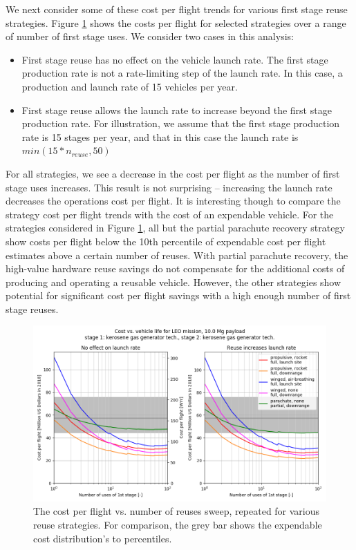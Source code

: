 \documentclass[conf]{new-aiaa}
\begin{document}
\begin{multicols}{2}
We next consider some of these cost per flight trends for various first stage reuse strategies. Figure \ref{fig:num_reuse_sweep_LEO_kerosene} shows the costs per flight for selected strategies over a range of number of first stage uses. We consider two cases in this analysis: 

\begin{itemize}
  \item First stage reuse has no effect on the vehicle launch rate. The first stage production rate is not a rate-limiting step of the launch rate. In this case, a production and launch rate of 15 vehicles per year. 
  \item First stage reuse allows the launch rate to increase beyond the first stage production rate. For illustration, we assume that the first stage production rate is 15 stages per year, and that in this case the launch rate is $min(15 * n_{reuse}, 50)$
\end{itemize}

For all strategies, we see a decrease in the cost per flight as the number of first stage uses increases. This result is not surprising -- increasing the launch rate decreases the operations cost per flight. It is interesting though to compare the strategy cost per flight trends with the cost of an expendable vehicle. For the strategies considered in Figure \ref{fig:num_reuse_sweep_LEO_kerosene}, all but the partial parachute recovery strategy show costs per flight below the 10th percentile of expendable cost per flight estimates above a certain number of reuses. With partial parachute recovery, the high-value hardware reuse savings do not compensate for the additional costs of producing and operating a reusable vehicle. However, the other strategies show potential for significant cost per flight savings with a high enough number of first stage reuses. 

\begin{figure}
    \centering
    \includegraphics[width=\textwidth]{../../lvreuse/analysis/combined/plots/num_reuse_sweep_LEO_kerosene}
    \caption{\label{fig:num_reuse_sweep_LEO_kerosene} The cost per flight vs. number of reuses sweep, repeated for various reuse strategies. For comparison, the grey bar shows the expendable cost distribution's  to  percentiles.}
\end{figure}


\end{multicols}
\end{document}
